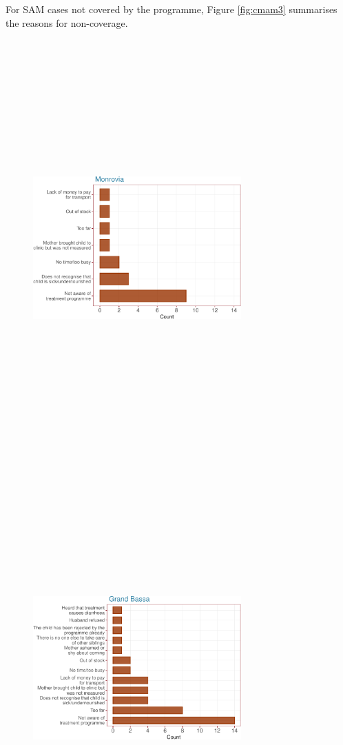 \documentclass[12pt,a4paper]{article}
\begin{document}
For SAM cases not covered by the programme, Figure \ref{fig:cmam3} summarises the reasons for non-coverage.

\begin{figure}[H]

{\centering \includegraphics[width=8cm,height=16cm]{liberiaCoverageFinalReport_files/figure-latex/cmam3-1} \includegraphics[width=8cm,height=16cm]{liberiaCoverageFinalReport_files/figure-latex/cmam3-2} 

}
\end{figure}
\end{document}
